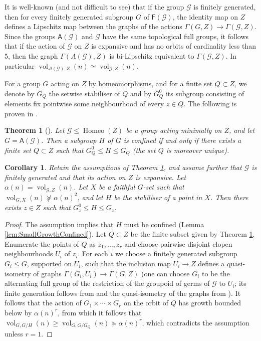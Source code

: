 \documentclass[11pt]{amsart}
\newcommand{\Gcal}{\ensuremath{\mathcal{G}}}%
\newcommand{\A}{\ensuremath{\mathcal{A}}}%
\newcommand{\vol}{\ensuremath{\operatorname{vol}}}%
\newcommand{\homeo}{\ensuremath{\operatorname{Homeo}}}%
\newcommand{\Fsf}{\ensuremath{\mathsf{F}}}
\newcommand{\Asf}{\ensuremath{\mathsf{A}}}
\theoremstyle{definition}
\theoremstyle{plain}
\newtheorem{thm}[defin]{Theorem}
\newtheorem{cor}[defin]{Corollary}
\theoremstyle{remark}
\begin{document}
It is well-known (and not difficult to see) that if the group $\Gcal$ is finitely generated, then for every finitely generated subgroup $G$ of $\Fsf(\Gcal)$, the identity map on $Z$  defines a Lipschitz map between the graphs of the actions $\Gamma(G, Z)\to \Gamma(\Gcal, Z)$. Since the groups $\Asf(\Gcal)$ and $\Gcal$ have the same topological full groups, it follows that if the action of $\Gcal$ on $Z$ is expansive and has no orbits of cardinality less than 5, then the graph $\Gamma(A(\Gcal), Z)$ is bi-Lipschitz equivalent to $\Gamma(\Gcal, Z)$. In particular $\vol_{\A(\Gcal), Z}(n)\simeq \vol_{\Gcal, Z}(n)$. 

For a group $G$ acting on $Z$ by homeomorphisms, and for a finite set $Q\subset  Z$, we denote by $G_Q$ the setwise stabiliser of $Q$ and by $G^0_Q$  its subgroup consisting of elements fix pointwise some neighbourhood of every $z\in Q$. The following is proven in \cite{MB-full}.

\begin{thm}[\cite{MB-full}] \label{t-confined-full}
Let $\Gcal\le \homeo(Z)$ be a group acting minimally on $Z$, and let $G=\Asf(\Gcal)$. Then a subgroup $H$ of $ G$ is confined if and only if there exists a finite set $Q\subset Z$ such that $G^0_Q\le H \le G_Q$ (the set $Q$ is moreover unique).
\end{thm} 

\begin{cor} \label{c-full-small-growth}
Retain the assumptions of Theorem \ref{t-confined-full}, and assume further that $\Gcal$ is finitely generated and that its action on $Z$ is expansive. Let  $\alpha(n)=\vol_{\mathcal{G}, Z}(n)$. Let $X$ be a faithful $G$-set such that $\vol_{G, X}(n)\not \succcurlyeq \alpha(n)^2$, and let $H$ be the stabiliser of a point in $X$. Then there exists $z\in Z$ such that $G^0_z\le H\le G_z$. 
\end{cor}

\begin{proof}
The assumption implies that $H$ must be confined (Lemma \ref{lem:SmallGrowthConfined}). Let $Q\subset Z$ be the finite subset given by Theorem \ref{t-confined-full}. Enumerate the points of $Q$ as  $z_1,\ldots, z_r$ and choose pairwise disjoint clopen neighbourhoods $U_i$ of $z_i$. For each $i$ we choose a finitely generated subgroup $G_i\le G$, supported on $U_i$, such that the inclusion map $U_i\to Z$ defines a quasi-isometry of graphs $\Gamma(G_i, U_i)\to \Gamma(G, Z)$ (one can choose $G_i$ to be the alternating full group of the restriction of the groupoid of germs of $\mathcal{G}$ to $U_i$; its finite generation follows from \cite[Proposition 5.4]{Nek-simple} and the quasi-isometry of the graphs from  \cite[Cor 2.3.4]{Nek-hyp}). 
It follows that the action of $G_1\times \cdots \times G_r$ on the orbit of $Q$ has growth bounded below by $\alpha(n)^r$, from which it follows that $\vol_{G, G/H}(n)\ge \vol_{G, G/G_Q}(n)\succcurlyeq \alpha(n)^r$, which contradicts the assumption unless $r=1$. \qedhere
\end{proof}
\end{document}
